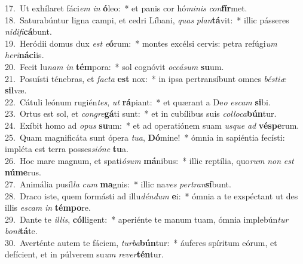 {17.~}Ut exhílaret fáci\textit{em} \textit{in} \textbf{ó}leo:~* et panis cor hó\textit{mi}\textit{nis} \textit{con}\textbf{fír}met.\\
{18.~}Saturabúntur ligna campi, et cedri Líbani, \textit{quas} \textit{plan}\textbf{tá}vit:~* illic pásseres \textit{ni}\textit{di}\textit{fi}\textbf{cá}bunt.\\
{19.~}Heródii domus dux \textit{est} \textit{e}\textbf{ó}rum:~* montes excélsi cervis: petra refúgi\textit{um} \textit{he}\textit{ri}\textbf{ná}\textbf{ci}is.\\
{20.~}Fecit lu\textit{nam} \textit{in} \textbf{tém}pora:~* sol cognóvit \textit{oc}\textit{cá}\textit{sum} \textbf{su}um.\\
{21.~}Posuísti ténebras, et \textit{fa}\textit{cta} \textbf{est} nox:~* in ipsa pertransíbunt omnes \textit{bé}\textit{sti}\textit{æ} \textbf{sil}væ.\\
{22.~}Cátuli leónum rugién\textit{tes}, \textit{ut} \textbf{rá}piant:~* et quærant a De\textit{o} \textit{e}\textit{scam} \textbf{si}bi.\\
{23.~}Ortus est sol, et \textit{con}\textit{gre}\textbf{gá}ti sunt:~* et in cubílibus suis \textit{col}\textit{lo}\textit{ca}\textbf{bún}tur.\\
{24.~}Exíbit homo ad \textit{o}\textit{pus} \textbf{su}um:~* et ad operatiónem suam \textit{us}\textit{que} \textit{ad} \textbf{vé}\textbf{spe}rum.\\
{25.~}Quam magnificáta sunt ópera \textit{tu}\textit{a}, \textbf{Dó}mine!~* ómnia in sapiéntia fecísti: impléta est terra posses\textit{si}\textit{ó}\textit{ne} \textbf{tu}a.\\
{26.~}Hoc mare magnum, et spati\textit{ó}\textit{sum} \textbf{má}nibus:~* illic reptília, quo\textit{rum} \textit{non} \textit{est} \textbf{nú}\textbf{me}rus.\\
{27.~}Animália pusíl\textit{la} \textit{cum} \textbf{ma}gnis:~* illic na\textit{ves} \textit{per}\textit{tran}\textbf{sí}bunt.\\
{28.~}Draco iste, quem formásti ad illu\textit{dén}\textit{dum} \textbf{e}i:~* ómnia a te exspéctant ut des illis \textit{e}\textit{scam} \textit{in} \textbf{tém}\textbf{po}re.\\
{29.~}Dante te \textit{il}\textit{lis}, \textbf{cól}ligent:~* aperiénte te manum tuam, ómnia implebún\textit{tur} \textit{bo}\textit{ni}\textbf{tá}te.\\
{30.~}Averténte autem te fáciem, \textit{tur}\textit{ba}\textbf{bún}tur:~* áuferes spíritum eórum, et defícient, et in púlverem su\textit{um} \textit{re}\textit{ver}\textbf{tén}tur.\\
